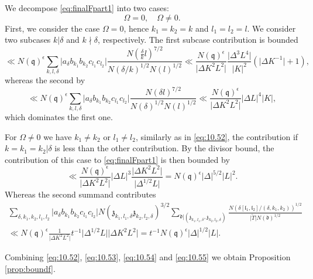 \documentclass[a4paper,11pt]{amsart}
\theoremstyle{definition}
\begin{document}
We decompose \eqref{eq:finalFpart1} into two cases:
\[ \Omega =0,\quad \Omega \neq 0. \]First, we consider the case $\Omega = 0$, hence $k_1=k_2=k$ and $l_1=l_2=l$. We consider two subcases $k|\delta$ and $k\nmid \delta$, respectively. The first subcase contribution is bounded
\begin{equation}\label{eq:10.52}
    \ll N(\mathfrak{q})^{\epsilon}\sum_{k,l,\delta}\vert a_\delta b_{k_1}b_{k_2}c_{l_1}c_{l_2}\vert\frac{N(\frac{\delta}{k}l)^{7/2}}{N(\delta/k)^{1/2}N(l)^{1/2}} \ll \frac{N(\mathfrak{q})^{\epsilon}}{\vert{\Delta K^2L^2}\vert}\frac{\vert{\Delta^3 L^4}\vert}{\vert{K}\vert^{2}}(\vert{\Delta K^{-1}}\vert+1),
\end{equation}
whereas the second by 
\begin{equation}\label{eq:10.53}
    \ll N(\mathfrak{q})^{\epsilon}\sum_{k,l,\delta}\vert a_\delta b_{k_1}b_{k_2}c_{l_1}c_{l_2}\vert\frac{N(\delta l)^{7/2}}{N(\delta)^{1/2}N(l)^{1/2}} \ll \frac{N(\mathfrak{q})^{\epsilon}}{\vert{\Delta K^2L^2}\vert}\vert{\Delta L}\vert^{4}\vert{K}\vert,
\end{equation}
which dominates the first one.

For $\Omega \neq 0$ we have $k_1\neq k_2$ or $l_1\neq l_2$, similarly as in \eqref{eq:10.52}, the contribution if $k=k_1=k_2|\delta$ is less than the other contribution. By the divisor bound, the contribution of this case to \eqref{eq:finalFpart1} is then bounded by 
\begin{equation}\label{eq:10.54}
    \ll \frac{N(\mathfrak{q})^{\epsilon}}{\vert{\Delta K^2L^2}\vert}\vert{\Delta L}\vert^3 \frac{\vert{\Delta K^2 L^2}\vert}{\vert{\Delta^{1/2}L}\vert} = N(\mathfrak{q})^{\epsilon}\vert\Delta\vert^{5/2}\vert L\vert^2.
\end{equation}
Whereas the second summand contributes
\begin{align}\label{eq:10.55}
\sum_{\delta,k_1,k_2,l_1,l_2}\vert a_\delta b_{k_1}b_{k_2}c_{l_1}c_{l_2}\vert N(\mathfrak{z}_{k_1,l_1,\delta}\mathfrak{z}_{k_2,l_2,\delta})^{3/2}\sum_{\mathfrak{d}|(\mathfrak{z}_{k_1,l_1,\delta},\mathfrak{z}_{k_2,l_2,\delta})}\frac{ N(\delta[\mathfrak{l}_1,\mathfrak{l}_2]/(\delta,k_1,k_2))^{1/2}}{\vert{\tilde{T}}\vert N(\mathfrak{d})^{1/2}} \nonumber\\ \ll N(\mathfrak{q})^{\epsilon}\frac{1}{\vert{\Delta K^2L^2}\vert}t^{-1}\vert{\Delta^{1/2} L}\vert\vert{\Delta K ^2L^2}\vert = t^{-1}N(\mathfrak{q})^{\epsilon}\vert\Delta\vert^{1/2}\vert L\vert.
\end{align}

Combining \eqref{eq:10.52}, \eqref{eq:10.53}, \eqref{eq:10.54} and \eqref{eq:10.55} we obtain Proposition \ref{prop:boundf}. 
\end{document}
